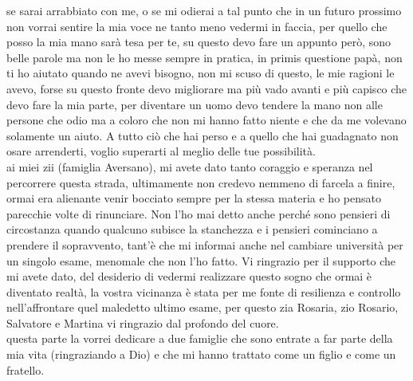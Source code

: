 se sarai arrabbiato con me, o se mi odierai a tal punto che in un futuro prossimo non vorrai sentire la mia voce ne tanto meno vedermi in faccia, per quello che posso la mia mano sarà tesa per te, su questo devo fare un appunto però, sono belle parole ma non le ho messe sempre in pratica, in primis questione papà, non ti ho aiutato quando ne avevi bisogno, non mi scuso di questo, le mie ragioni le avevo, forse su questo fronte devo migliorare ma più vado avanti e più capisco che devo fare la mia parte, per diventare un uomo devo tendere la mano non alle persone che odio ma a coloro che non mi hanno fatto niente e che da me volevano solamente un aiuto.
A tutto ciò che hai perso e a quello che hai guadagnato non osare arrenderti, voglio superarti al meglio delle tue possibilità.\\


ai miei zii (famiglia Aversano),
mi avete dato tanto coraggio e speranza nel percorrere questa strada, ultimamente non credevo nemmeno di farcela a finire, ormai era alienante venir bocciato sempre per la stessa materia e ho pensato parecchie volte di rinunciare. Non l'ho mai detto anche perché sono pensieri di circostanza quando qualcuno subisce la stanchezza e i pensieri cominciano a prendere il sopravvento, tant'è che mi informai anche nel cambiare università per un singolo esame, menomale che non l'ho fatto. Vi ringrazio per il supporto che mi avete dato, del desiderio di vedermi realizzare questo sogno che ormai è diventato realtà, la vostra vicinanza è stata per me fonte di resilienza e controllo nell'affrontare quel maledetto ultimo esame, per questo zia Rosaria, zio Rosario, Salvatore e Martina vi ringrazio dal profondo del cuore.\\

questa parte la vorrei dedicare a due famiglie che sono entrate a far parte della mia vita (ringraziando a Dio) e che mi hanno trattato come un figlio e come un fratello.\\

